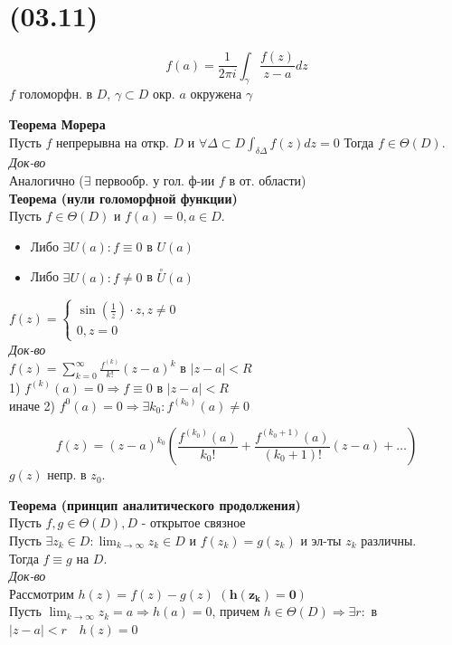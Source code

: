 \section{(03.11)}
$$
f(a) = \frac{1}{2\pi i}\int_{\gamma}{\frac{f(z)}{z-a}dz}
$$
$f$ голоморфн. в $D$, $\gamma \subset D \text{ окр. } a \text{ окружена } \gamma$

\begin{figure}[H]
\end{figure}

\textbf{Теорема Морера}\\
Пусть $f$ непрерывна на откр. $D$ и $\forall \Delta\subset D \int_{\delta\Delta}{f(z)dz}=0$
Тогда $f\in\Theta(D)$.\\
\textit{Док-во}\\
Аналогично ($\exists$ первообр. у гол. ф-ии $f$ в от. области)\\

\textbf{Теорема (нули голоморфной функции)}\\
Пусть $f\in\Theta(D)$ и $f(a)=0, a\in D$.
\begin{itemize}
    \item Либо $\exists U(a): f\equiv 0$ в $U(a)$
    \item Либо $\exists U(a): f\neq 0$ в $\overset{\circ}{U}(a)$
\end{itemize}

$f(z)=
\begin{cases}
    \sin(\frac{1}{z})\cdot z, z\neq 0\\
    0, z = 0
\end{cases}
$\\

\textit{Док-во}\\
$f(z)=\sum_{k=0}^{\infty}{\frac{f^{(k)}}{k!}(z-a)^k}$ в 
$|z-a|<R$\\
1) $f^{(k)}(a)=0\Rightarrow f\equiv 0$ в $|z-a|<R$\\
иначе 2) $f^{0}(a)=0\Rightarrow \exists k_0: f^{(k_0)}(a)\neq 0$

$$
f(z)=(z-a)^{k_0}\left( \frac{f^{(k_0)}(a)}{k_0!}+\frac{f^{(k_0+1)}(a)}{(k_0+1)!}(z-a)+\dots \right)
$$
$g(z)$ непр. в $z_0$.

\textbf{Теорема (принцип аналитического продолжения)}\\
Пусть $f,g\in \Theta(D), D$ - открытое связное\\
Пусть $\exists z_k\in D: \lim_{k\to\infty}{z_k}\in D$ и $f(z_k)=g(z_k)$
и эл-ты $z_k$ различны.\\
Тогда $f\equiv g$ на $D$.\\
\textit{Док-во}\\
Рассмотрим $h(z)=f(z)-g(z)$     $\mathbf{(h(z_k)=0)}$\\
Пусть $\lim_{k\to\infty}{z_k}=a\Rightarrow h(a)=0$, причем
$h\in\Theta (D) \Rightarrow \exists r:$ в $|z-a|<r\quad h(z)=0$

